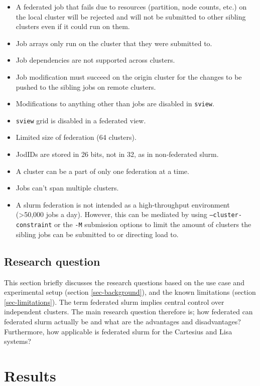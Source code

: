 \documentclass[conference]{IEEEtran}
\begin{document}
\begin{itemize}
    \item A federated job that fails due to resources (partition, node counts, etc.) on the local cluster will be rejected and will not be submitted to other sibling clusters even if it could run on them.
    \item Job arrays only run on the cluster that they were submitted to.
    \item Job dependencies are not supported across clusters.
    \item Job modification must succeed on the origin cluster for the changes to be pushed to the sibling jobs on remote clusters.
    \item Modifications to anything other than jobs are disabled in \texttt{sview}.
    \item \texttt{sview} grid is disabled in a federated view.
    \item Limited size of federation (64 clusters).
    \item JodIDs are stored in 26 bits, not in 32, as in non-federated \gls{slurm}.
    \item A cluster can be a part of only one federation at a time.
    \item Jobs can't span multiple clusters.
    \item A \gls{slurm} federation is not intended as a high-throughput environment (\textgreater 50,000 jobs a day). However, this can be mediated by using \texttt{--cluster-constraint} or the \texttt{-M} submission options to limit the amount of clusters the sibling jobs can be submitted to or directing load to.
\end{itemize}


\subsection{Research question}
This section briefly discusses the research questions based on the use case and experimental setup (section \ref{sec-background}), and the known limitations (section \ref{sec-limitations}). The term federated \gls{slurm} implies central control over independent clusters. The main research question therefore is; how federated can federated \gls{slurm} actually be and what are the advantages and disadvantages? Furthermore, how applicable is federated \gls{slurm} for the Cartesius and Lisa systems?


\section{Results}
\end{document}
